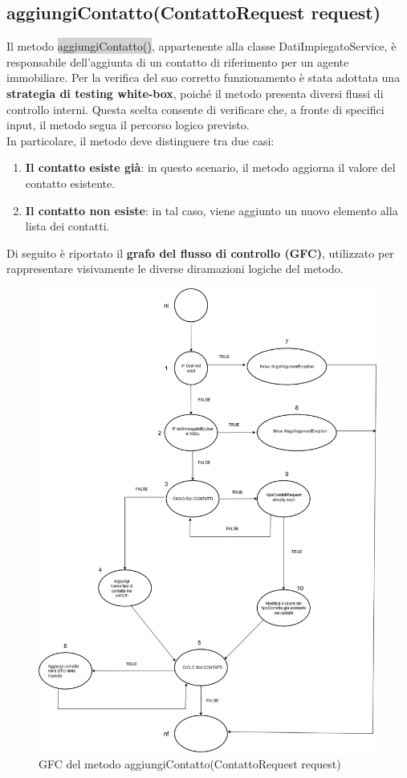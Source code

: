 \subsection{aggiungiContatto(ContattoRequest request)}

Il metodo  \colorbox{lightgray}{aggiungiContatto()}, appartenente alla classe DatiImpiegatoService, è responsabile dell’aggiunta di un contatto di riferimento per un agente immobiliare.
Per la verifica del suo corretto funzionamento è stata adottata una \textbf{strategia di testing white-box}, poiché il metodo presenta diversi flussi di controllo interni. Questa scelta consente di verificare che, a fronte di specifici input, il metodo segua il percorso logico previsto.
\\
In particolare, il metodo deve distinguere tra due casi:
\begin{enumerate}
	\item \textbf{Il contatto esiste già}: in questo scenario, il metodo aggiorna il valore del contatto esistente.
	\item \textbf{Il contatto non esiste}: in tal caso, viene aggiunto un nuovo elemento alla lista dei contatti.
\end{enumerate}
Di seguito è riportato il \textbf{grafo del flusso di controllo (GFC)}, utilizzato per rappresentare visivamente le diverse diramazioni logiche del metodo.

\begin{figure}[H]
	\centering
	\includegraphics[width=0.7\linewidth]{Immagini/unit test/GrafoAggiungiUnContatto.png}
	\caption[GFC aggiungiContatto]{GFC del metodo aggiungiContatto(ContattoRequest request)}
\end{figure}


